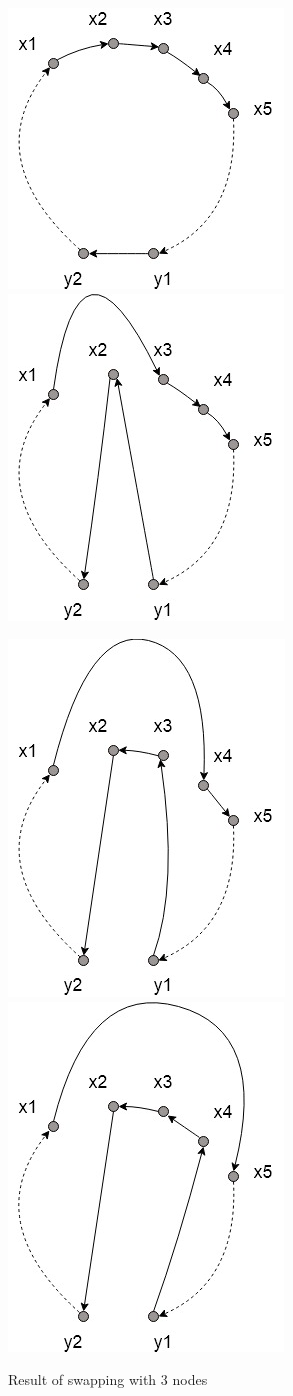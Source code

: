 \documentclass[12pt,a4paper,oneside]{book}
\begin{document}
\begin{multicols}{2}
\begin{figure}[ht!]
\includegraphics[width=.3\textwidth]{two-half/two-half.jpg}\hfill
\includegraphics[width=.3\textwidth]{two-half/two-half-1.jpg}\hfill

\includegraphics[width=.3\textwidth]{two-half/two-half-2.jpg}\hfill
\includegraphics[width=.3\textwidth]{two-half/two-half-3.jpg}
\caption{Initial tour} \label{fig:twohalf}
\caption{Result of swapping with 1 node} \label{fig:twohalf1}
\caption{Result of swapping with 2 nodes} \label{fig:twohalf2}
\caption{Result of swapping with 3 nodes} \label{fig:twohalf3}
\end{figure}
\end{multicols}
\end{document}
